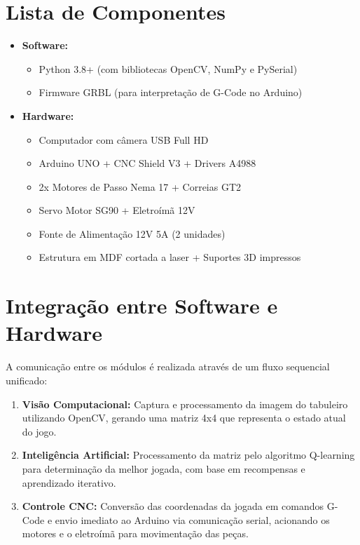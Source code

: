 \documentclass[a4paper,12pt]{article}
\begin{document}
\section{Lista de Componentes}  
\begin{itemize}  
    \item \textbf{Software:}  
    \begin{itemize}  
        \item Python 3.8+ (com bibliotecas OpenCV, NumPy e PySerial)  
        \item Firmware GRBL (para interpretação de G-Code no Arduino)  
    \end{itemize}  
    \item \textbf{Hardware:}  
    \begin{itemize}  
        \item Computador com câmera USB Full HD  
        \item Arduino UNO + CNC Shield V3 + Drivers A4988  
        \item 2x Motores de Passo Nema 17 + Correias GT2  
        \item Servo Motor SG90 + Eletroímã 12V  
        \item Fonte de Alimentação 12V 5A (2 unidades)  
        \item Estrutura em MDF cortada a laser + Suportes 3D impressos  
    \end{itemize}  
\end{itemize}  

\section{Integração entre Software e Hardware}  
A comunicação entre os módulos é realizada através de um fluxo sequencial unificado:  
\begin{enumerate}  
    \item \textbf{Visão Computacional:} Captura e processamento da imagem do tabuleiro utilizando OpenCV, gerando uma matriz 4x4 que representa o estado atual do jogo.  
    \item \textbf{Inteligência Artificial:} Processamento da matriz pelo algoritmo Q-learning para determinação da melhor jogada, com base em recompensas e aprendizado iterativo.  
    \item \textbf{Controle CNC:} Conversão das coordenadas da jogada em comandos G-Code e envio imediato ao Arduino via comunicação serial, acionando os motores e o eletroímã para movimentação das peças.  
\end{enumerate}  
\end{document}
